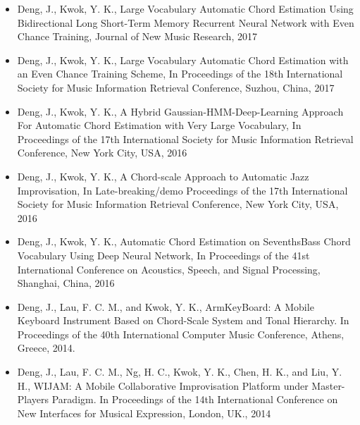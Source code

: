 \begin{itemize}
\item Deng, J., Kwok, Y. K., Large Vocabulary Automatic Chord Estimation Using Bidirectional Long Short-Term Memory Recurrent Neural Network with Even Chance Training, Journal of New Music Research, 2017
\item Deng, J., Kwok, Y. K., Large Vocabulary Automatic Chord Estimation with an Even Chance Training Scheme, In Proceedings of the 18th International Society for Music Information Retrieval Conference, Suzhou, China, 2017
\item Deng, J., Kwok, Y. K., A Hybrid Gaussian-HMM-Deep-Learning Approach For Automatic Chord Estimation with Very Large Vocabulary, In Proceedings of the 17th International Society for Music Information Retrieval Conference, New York City, USA, 2016
\item Deng, J., Kwok, Y. K., A Chord-scale Approach to Automatic Jazz Improvisation, In Late-breaking/demo Proceedings of the 17th International Society for Music Information Retrieval Conference, New York City, USA, 2016
\item Deng, J., Kwok, Y. K., Automatic Chord Estimation on SeventhsBass Chord Vocabulary Using Deep Neural Network, In Proceedings of the 41st International Conference on Acoustics, Speech, and Signal Processing, Shanghai, China, 2016
\item Deng, J., Lau, F. C. M., and Kwok, Y. K., ArmKeyBoard: A Mobile Keyboard Instrument Based on Chord-Scale System and Tonal Hierarchy. In Proceedings of the 40th International Computer Music Conference, Athens, Greece, 2014.
\item Deng, J., Lau, F. C. M., Ng, H. C., Kwok, Y. K., Chen, H. K., and Liu, Y. H., WIJAM: A Mobile Collaborative Improvisation Platform under Master-Players Paradigm. In Proceedings of the 14th International Conference on New Interfaces for Musical Expression, London, UK., 2014
\end{itemize}




